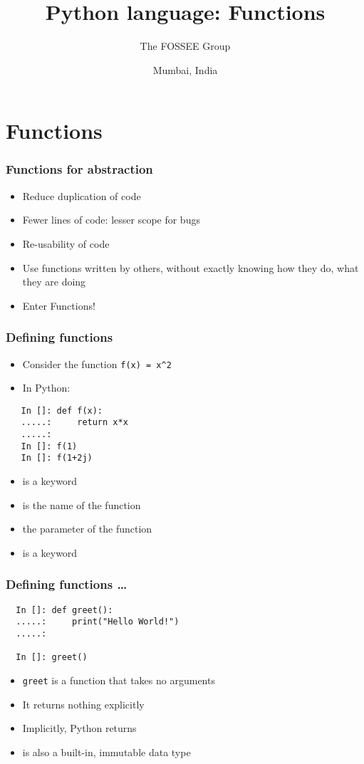 \documentclass[14pt,compress]{beamer}
\title[Functions]{Python language: Functions}
\author[FOSSEE Team] {The FOSSEE Group}
\institute[IIT Bombay] {Department of Aerospace Engineering\\IIT Bombay}
\date[] {Mumbai, India}
\begin{document}
\begin{frame}
  \titlepage
\end{frame}

\section{Functions}

\begin{frame}[fragile]
  \frametitle{Functions for abstraction}
  \begin{itemize}
  \item Reduce duplication of code
  \item Fewer lines of code: lesser scope for bugs
  \item Re-usability of code
  \item Use functions written by others, without exactly knowing how
    they do, what they are doing
  \item \alert{Enter Functions!}
  \end{itemize}
\end{frame}

\begin{frame}[fragile]
  \frametitle{Defining functions}
  \begin{itemize}
  \item Consider the function \texttt{f(x) = x\textasciicircum{}2}
  \item In Python:
  \end{itemize}
  \begin{lstlisting}
   In []: def f(x):
   .....:     return x*x
   .....:
   In []: f(1)
   In []: f(1+2j)
  \end{lstlisting}
  \begin{itemize}
  \item {} is a keyword
  \item {} is the name of the function
  \item {} the parameter of the function
  \item {} is a keyword
  \end{itemize}
\end{frame}


\begin{frame}[fragile]
  \frametitle{Defining functions \ldots}
  \begin{lstlisting}
  In []: def greet():
  .....:     print("Hello World!")
  .....:

  In []: greet()
  \end{lstlisting}
  \begin{itemize}
  \item \texttt{greet} is a function that takes no arguments
  \item It returns nothing explicitly
  \item Implicitly, Python returns 
  \item {} is also a built-in, immutable data type
  \end{itemize}
\end{frame}
\end{document}
